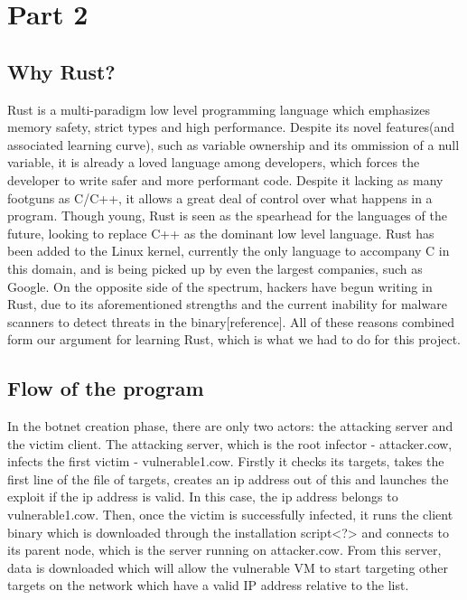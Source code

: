 \documentclass[../main.tex]{subfiles}
\begin{document}
	\chapter{Part 2}


	\section{Why Rust?}


Rust is a multi-paradigm low level programming language which emphasizes memory safety, strict types and high performance. Despite its novel features(and associated learning curve),
such as variable ownership and its ommission of a null variable, it is already a loved language among developers, which forces the developer to write safer and more performant code.
Despite it lacking as many footguns as C/C++, it allows a great deal of control over what happens in a program. Though young, Rust is seen as the spearhead for the languages of the 
future, looking to replace C++ as the dominant low level language. Rust has been added to the Linux kernel, currently the only language to accompany C in this domain, and is being 
picked up by even the largest companies, such as Google. On the opposite side of the spectrum, hackers have begun writing in Rust, due to its aforementioned strengths and the 
current inability for malware scanners to detect threats in the binary[reference]. All of these reasons combined form our argument for learning Rust, which is what we had to do for
this project.

	\vspace{10pt}

	\section{Flow of the program}

In the botnet creation phase, there are only two actors: the attacking server and the victim client. The attacking server, which is the root infector - attacker.cow, infects the first
victim - vulnerable1.cow. Firstly it checks its targets, takes the first line of the file of targets, creates an ip address out of this and launches the exploit if the ip address is
valid. In this case, the ip address belongs to vulnerable1.cow. Then, once the victim is successfully infected, it runs the client binary which is downloaded through the installation
script<?> and connects to its parent node, which is the server running on attacker.cow. From this server, data is downloaded which will allow the vulnerable VM to start targeting other targets on the network which have a valid IP address relative to the list.
\end{document}
